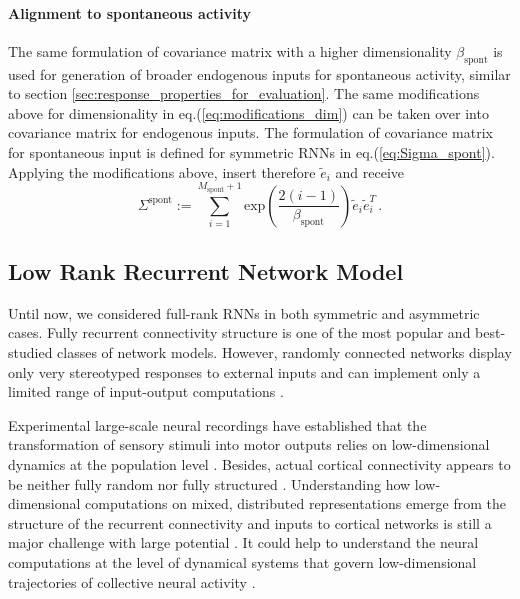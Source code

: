 \documentclass[11pt]{article}
\begin{document}
{	\paragraph{Alignment to spontaneous activity} %
	The same formulation of covariance matrix with a higher dimensionality $\beta_{\text{spont}}$ is used for generation of broader endogenous inputs for spontaneous activity, similar to section \ref{sec:response_properties_for_evaluation}. The same modifications above for dimensionality in eq.(\ref{eq:modifications_dim}) can be taken over into covariance matrix for endogenous inputs. The formulation of covariance matrix for spontaneous input is defined for symmetric RNNs in eq.(\ref{eq:Sigma_spont}). Applying the modifications above, insert therefore $\tilde{e}_i$ and receive  
	  	\begin{equation} \label{eq:Sigma_spont_asym}
	  		\Sigma^{\text{spont}} := \sum_{i=1}^{M_{\text{spont}} + 1} 	\text{exp}\left(\frac{2(i-1)}{\beta_{\text{spont}}}\right) \tilde{e}_i \tilde{e}_i^T \, .
	  	\end{equation}
				  
	\clearpage
	\subsection{Low Rank Recurrent Network Model}
	Until now, we considered full-rank RNNs in both symmetric and asymmetric cases. Fully recurrent connectivity structure is one of the most popular and best-studied classes of network models. However, randomly connected networks display only very stereotyped responses to external inputs and can implement only a limited range of input-output computations \cite{mastrogiuseppe2018linking}. 
	
	Experimental large-scale neural recordings have established that the transformation of sensory stimuli into motor outputs relies on low-dimensional dynamics at the population level \cite{mastrogiuseppe2018linking}. Besides, actual cortical connectivity appears to be neither fully random nor fully structured \cite{harris2013cortical}. Understanding how low-dimensional computations on mixed, distributed representations emerge from the structure of the recurrent connectivity and inputs to cortical networks is still a major challenge with large potential \cite{mastrogiuseppe2018linking}. It could help to understand the neural computations at the level of dynamical systems that govern low-dimensional trajectories of collective neural activity \cite{beiran2021shaping}. 
	
}
\end{document}
